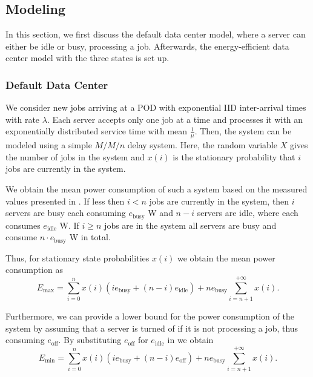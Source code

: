 \subsection{Modeling}\label{sec:cloud:data_centers:modeling}
In this section, we first discuss the default data center model, where a server can either be idle or busy, processing a job. Afterwards, the energy-efficient data center model with the three states is set up.

\subsubsection*{Default Data Center}\label{sec:cloud:data_centers:modeling:default}
We consider new jobs arriving at a \gls{POD} with exponential \gls{IID} inter-arrival times with rate \(\lambda\).
Each server accepts only one job at a time and processes it with an exponentially distributed service time with mean \(\frac{1}{\mu}\).
Then, the system can be modeled using a simple \(M/M/n\) delay system.
Here, the random variable \(X\) gives the number of jobs in the system and \(x(i)\) is the stationary probability that \(i\) jobs are currently in the system.

We obtain the mean power consumption of such a system based on the measured values presented in .
If less then \(i < n\) jobs are currently in the system, then \(i\) servers are busy each consuming \(e_\text{busy}\) \si{\watt} and \(n-i\) servers are idle, where each consumes \(e_\text{idle}\) \si{\watt}.
If \(i \geq n\) jobs are in the system all servers are busy and consume \(n\cdot e_\text{busy}\) \si{\watt} in total.

Thus, for stationary state probabilities \(x(i)\) we obtain the mean power consumption as
\begin{equation}\label{sec:cloud:data_centers:modeling:default:emax}
E_\text{max} = \sum_{i=0}^{n} x(i) (i e_\text{busy} + (n-i) e_\text{idle}) + ne_\text{busy} \sum_{i=n + 1}^{+ \infty} x(i).
\end{equation}

Furthermore, we can provide a lower bound for the power consumption of the system by assuming that a server is turned of if it is not processing a job, thus consuming \(e_\text{off}\).
By substituting \(e_\text{off}\) for \(e_\text{idle}\) in  we obtain
\begin{equation*}
E_\text{min} = \sum_{i=0}^{n} x(i) (i e_\text{busy} + (n-i) e_\text{off}) + ne_\text{busy} \sum_{i=n + 1}^{+ \infty} x(i).
\end{equation*}

